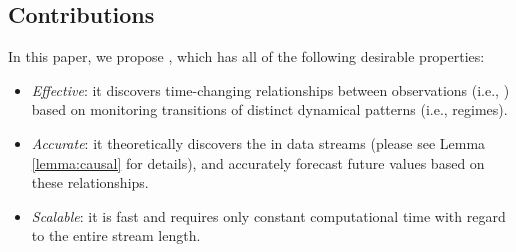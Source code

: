 \subsection{Contributions} 
In this paper, we propose \method, which has all of the following desirable properties: \par
{\setlength{\leftmargini}{12pt}
\begin{itemize}
\item \textit{Effective}:
it discovers time-changing relationships between observations (i.e., \relation) based on monitoring transitions of distinct dynamical patterns (i.e., regimes).
\item\textit{Accurate}:
it theoretically discovers the \relation in data streams (please see Lemma \ref{lemma:causal} for details), and accurately forecast future values based on these relationships.
\item \textit{Scalable}:
it is fast and requires only constant computational time with regard to the entire stream length.
\end{itemize}
}

